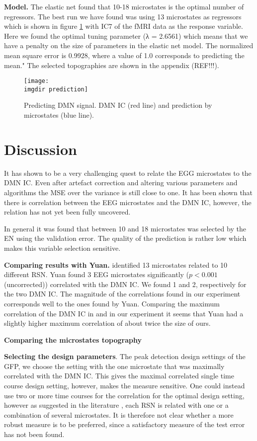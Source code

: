 \documentclass{article}
\newcommand{\imgdir}{Images/} %
\begin{document}
\textbf{Model.} The elastic net found that 10-18 microstates is the optimal number of regressors.  The best run we have found was using 13 microstates as regressors which is shown in figure \ref{fig:pred} with IC7 of the fMRI data as the response variable. Here we found the optimal tuning parameter (λ = 2.6561) which means that we have a penalty on the size of parameters in the elastic net model. The normalized mean square error is 0.9928, where a value of 1.0 corresponds to predicting the mean."
The selected topographies are shown in the appendix (REF!!!).

\begin{figure}[!ht]
    \centering
    \texttt{[image: \\imgdir prediction]}
    \caption{Predicting DMN signal. DMN IC (red line) and prediction by microstates (blue line).}
    \label{fig:pred}
\end{figure}

\section{Discussion}
It has shown to be a very challenging quest to relate the EGG microstates to the DMN IC. Even after artefact correction and altering various parameters and algorithms the MSE over the variance is still close to one. It has been shown that there is correlation between the EEG microstates and the DMN IC, however, the relation has not yet been fully uncovered.

In general it was found that between 10 and 18 microstates was selected by the EN using the validation error. The quality of the prediction is rather low which makes this variable selection sensitive.

\textbf{Comparing results with Yuan.} \cite{Yuan20122062} identified 13 microstates related to 10 different RSN. Yuan found 3 EEG microstates significantly ($p<0.001$ (uncorrected)) correlated with the DMN IC. We found 1 and 2, respectively for the two DMN IC.
The magnitude of the correlations found in our experiment corresponds well to the ones found by Yuan. Comparing the maximum correlation of the DMN IC in \cite{Yuan20122062} and in our experiment it seems that Yuan had a slightly higher maximum correlation of about twice the size of ours.


\textbf{Comparing the microstates topography} 

\textbf{Selecting the design parameters}. The peak detection design settings of the GFP, we choose the setting with the one microstate that was maximally correlated with the DMN IC. This gives the maximal correlated single time course design setting, however,  makes the measure sensitive. One could instead use two or more time courses for the correlation for the optimal design setting, however as suggested in the literature \cite{Yuan20122062}, each RSN is related with one or a combination of several microstates. It is therefore not clear whether a more robust measure is to be preferred, since a satisfactory measure of the test error has not been found.
\end{document}
